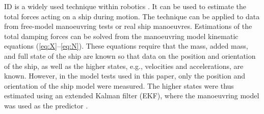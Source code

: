 ID is a widely used technique within robotics \citep{faber_inverse_2018, haningerNonparametricInverseDynamic2019, mastalliInverseDynamicsMPCNullspace2023, sunHighorderInverseDynamics2023, kurtzInverseDynamicsTrajectory2023}. It can be used to estimate the total forces acting on a ship during motion. The technique can be applied to data from free-model manoeuvring tests or real ship manoeuvres. 
Estimations of the total damping forces can be solved from the manoeuvring model kinematic equations  (\autoref{eq:X}--\autoref{eq:N}). These equations require that the mass, added mass, and full state of the ship are known so that data on the position and orientation of the ship, as well as the higher states, e.g., velocities and accelerations, are known.
However, in the model tests used in this paper, only the position and orientation of the ship model were measured.
The higher states were thus estimated using an extended Kalman filter (EKF), where the manoeuvring model was used as the predictor \citep{alexandersson_system_2022}.

